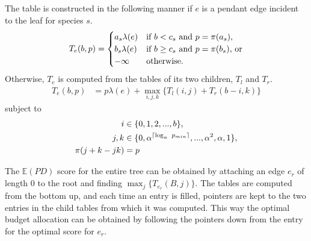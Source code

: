 \documentclass[10pt]{llncs}       \usepackage{graphicx,subfigure}
\begin{document}
The table is constructed in the following manner if $e$ is a pendant edge
incident to the leaf for species $s$.
\begin{equation}
  \label{eq:dptable}
T_e(b,p) =  \begin{cases}
a_s \lambda(e) & \text{if $b < c_s$ and $p = \pi(a_s)$,} \cr
b_s \lambda(e) & \text{if $b \geq c_s$ and $p = \pi(b_s)$, or} \cr
-\infty & \text{otherwise.} \cr
\end{cases} 
\end{equation}
Otherwise, $T_e$ is computed from the tables of its two children, $T_l$ and 
$T_r$.
\begin{align}
\label{eq:dpinternal}
T_e(b,p) &= p \lambda(e) + \max_{i,j,k}\{ T_l(i,j) + T_r(b-i,k) \}
\end{align}
subject to 
\begin{align*}
i &\in \{0,1,2,...,b\}, \notag\\
j,k &\in  \{0,\alpha^{\lceil\log_\alpha\ p_{min} \rceil}, ...,
\alpha^2, \alpha,1\}, \notag\\ 
\pi(j + k-jk) &= p
\end{align*}

The $\mathbb{E}(PD)$ score
for the entire tree can be obtained by attaching an edge $e_r$ of length
0 to the root and finding $\max_j\{T_{e_r}(B,j)\}$.  
The tables are computed from the bottom up, and
each time an entry is filled, pointers are kept to the two entries 
in the child tables from which it was computed.  This way the optimal
budget allocation can be obtained by following the pointers down from 
the entry for the optimal score for $e_r$. 
\end{document}

